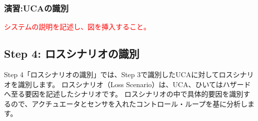 \subsubsection{演習:UCAの識別} %

\textcolor{red}{システムの説明を記述し、図を挿入すること。}

\subsection{Step 4: ロスシナリオの識別}

Step 4「ロスシナリオの識別」では、Step 3で識別したUCAに対してロスシナリオを識別します。
ロスシナリオ（Loss Scenario）は、UCA、ひいてはハザードへ至る要因を記述したシナリオです。
ロスシナリオの中で具体的要因を識別するので、アクチュエータとセンサを入れたコントロール・ループを基に分析します。

